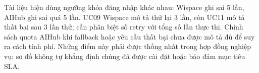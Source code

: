 Tài liệu hiện dùng ngưỡng khóa đăng nhập khác nhau: Wispace ghi sai 5 lần, AIHub ghi sai quá 5 lần. UC09 Wispace mô tả thử lại 3 lần, còn UC11 mô tả thất bại sau 3 lần thử; cần phân biệt số retry với tổng số lần thực thi. Chính sách quota AIHub khi fallback hoặc yêu cầu thất bại chưa được mô tả đủ để suy ra cách tính phí. Những điểm này phải được thống nhất trong hợp đồng nghiệp vụ; sơ đồ không tự khẳng định chúng đã được cài đặt hoặc bảo đảm mục tiêu SLA.
